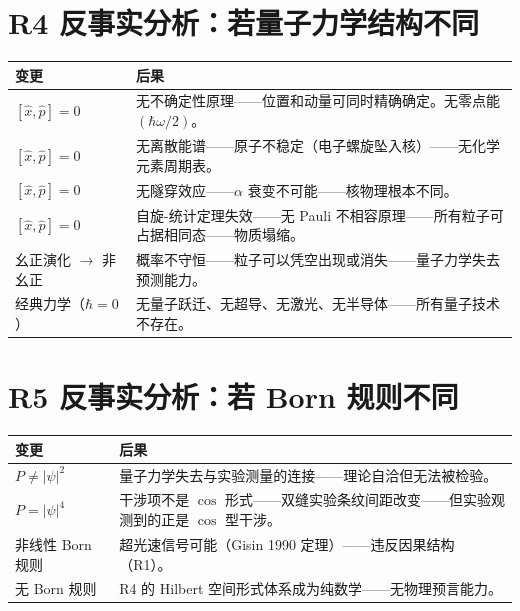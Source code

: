 \section{R4 反事实分析：若量子力学结构不同}

\begin{center}
\footnotesize
\begin{longtable}{p{3cm}p{10cm}}
\toprule
\textbf{变更} & \textbf{后果} \\
\midrule
$[\hat{x},\hat{p}] = 0$ & 无不确定性原理——位置和动量可同时精确确定。无零点能 $(\hbar\omega/2)$。\\
$[\hat{x},\hat{p}] = 0$ & 无离散能谱——原子不稳定（电子螺旋坠入核）——无化学元素周期表。\\
$[\hat{x},\hat{p}] = 0$ & 无隧穿效应——$\alpha$ 衰变不可能——核物理根本不同。\\
$[\hat{x},\hat{p}] = 0$ & 自旋-统计定理失效——无 Pauli 不相容原理——所有粒子可占据相同态——物质塌缩。\\
幺正演化 $\to$ 非幺正 & 概率不守恒——粒子可以凭空出现或消失——量子力学失去预测能力。\\
经典力学（$\hbar=0$） & 无量子跃迁、无超导、无激光、无半导体——所有量子技术不存在。\\
\bottomrule
\end{longtable}
\end{center}


\section{R5 反事实分析：若 Born 规则不同}

\begin{center}
\footnotesize
\begin{longtable}{p{3cm}p{10cm}}
\toprule
\textbf{变更} & \textbf{后果} \\
\midrule
$P \neq |\psi|^2$ & 量子力学失去与实验测量的连接——理论自洽但无法被检验。\\
$P = |\psi|^4$ & 干涉项不是 $\cos$ 形式——双缝实验条纹间距改变——但实验观测到的正是 $\cos$ 型干涉。\\
非线性 Born 规则 & 超光速信号可能（Gisin 1990 定理）——违反因果结构（R1）。\\
无 Born 规则 & R4 的 Hilbert 空间形式体系成为纯数学——无物理预言能力。\\
\bottomrule
\end{longtable}
\end{center}

